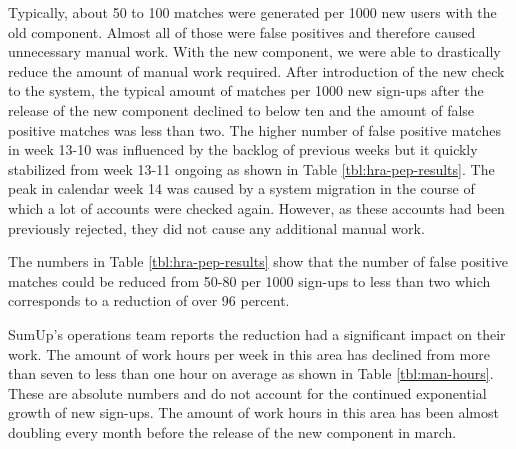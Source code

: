 \documentclass[a4paper, oneside]{csthesis}
\begin{document}
Typically, about 50 to 100 matches were generated per 1000 new users with the old component. Almost all of those were false positives and therefore caused unnecessary manual work. With the new component, we were able to drastically reduce the amount of manual work required. After introduction of the new check to the system, the typical amount of matches per 1000 new sign-ups after the release of the new component declined to below ten and the amount of false positive matches was less than two. The higher number of false positive matches in week 13-10 was influenced by the backlog of previous weeks but it quickly stabilized from week 13-11 ongoing as shown in Table \ref{tbl:hra-pep-results}. The peak in calendar week 14 was caused by a system migration in the course of which a lot of accounts were checked again. However, as these accounts had been previously rejected, they did not cause any additional manual work.

The numbers in Table \ref{tbl:hra-pep-results} show that the number of false positive matches could be reduced from 50-80 per 1000 sign-ups to less than two which corresponds to a reduction of over 96 percent.

SumUp's operations team reports the reduction had a significant impact on their work. The amount of work hours per week in this area has declined from more than seven to less than one hour on average as shown in Table \ref{tbl:man-hours}. These are absolute numbers and do not account for the continued exponential growth of new sign-ups. The amount of work hours in this area has been almost doubling every month before the release of the new component in march.
\end{document}
